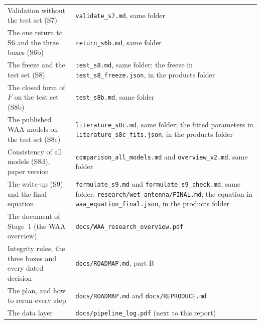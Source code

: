 \documentclass[11pt,a4paper]{article}
\newcommand{\code}[1]{\texttt{#1}}
\begin{document}
{\begin{tabularx}{\linewidth}{@{}l Y@{}}
Validation without the test set (S7) & \code{validate\_s7.md}, same folder \\
The one return to S6 and the three boxes (S6b) & \code{return\_s6b.md}, same folder \\
The freeze and the test set (S8) & \code{test\_s8.md}, same folder; the freeze in \code{test\_s8\_freeze.json}, in the products folder \\
The closed form of $F$ on the test set (S8b) & \code{test\_s8b.md}, same folder \\
The published WAA models on the test set (S8c) & \code{literature\_s8c.md}, same folder; the fitted parameters in \code{literature\_s8c\_fits.json}, in the products folder \\
Consistency of all models (S8d), paper version & \code{comparison\_all\_models.md} and \code{overview\_v2.md}, same folder \\
The write-up (S9) and the final equation & \code{formulate\_s9.md} and \code{formulate\_s9\_check.md}, same folder; \code{research/wet\_antenna/FINAL.md}; the equation in \code{waa\_equation\_final.json}, in the products folder \\
The document of Stage~1 (the WAA overview) & \code{docs/WAA\_research\_overview.pdf} \\
Integrity rules, the three boxes and every dated decision & \code{docs/ROADMAP.md}, part B \\
The plan, and how to rerun every step & \code{docs/ROADMAP.md} and \code{docs/REPRODUCE.md} \\
The data layer & \code{docs/pipeline\_log.pdf} (next to this report) \\
\bottomrule
\end{tabularx}}
\end{document}
